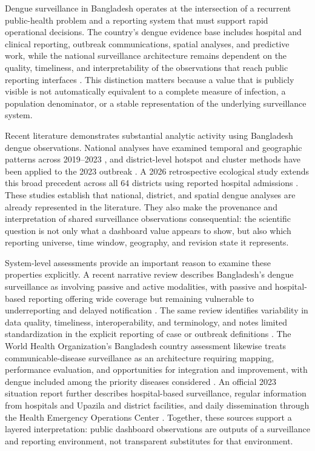 Dengue surveillance in Bangladesh operates at the intersection of a recurrent public-health problem and a reporting system that must support rapid operational decisions. The country's dengue evidence base includes hospital and clinical reporting, outbreak communications, spatial analyses, and predictive work, while the national surveillance architecture remains dependent on the quality, timeliness, and interpretability of the observations that reach public reporting interfaces \citep{ref1,ref6}. This distinction matters because a value that is publicly visible is not automatically equivalent to a complete measure of infection, a population denominator, or a stable representation of the underlying surveillance system.

Recent literature demonstrates substantial analytic activity using Bangladesh dengue observations. National analyses have examined temporal and geographic patterns across 2019--2023 \citep{ref2}, and district-level hotspot and cluster methods have been applied to the 2023 outbreak \citep{ref3}. A 2026 retrospective ecological study extends this broad precedent across all 64 districts using reported hospital admissions \citep{ref4}. These studies establish that national, district, and spatial dengue analyses are already represented in the literature. They also make the provenance and interpretation of shared surveillance observations consequential: the scientific question is not only what a dashboard value appears to show, but also which reporting universe, time window, geography, and revision state it represents.

System-level assessments provide an important reason to examine these properties explicitly. A recent narrative review describes Bangladesh's dengue surveillance as involving passive and active modalities, with passive and hospital-based reporting offering wide coverage but remaining vulnerable to underreporting and delayed notification \citep{ref1}. The same review identifies variability in data quality, timeliness, interoperability, and terminology, and notes limited standardization in the explicit reporting of case or outbreak definitions \citep{ref1}. The World Health Organization's Bangladesh country assessment likewise treats communicable-disease surveillance as an architecture requiring mapping, performance evaluation, and opportunities for integration and improvement, with dengue included among the priority diseases considered \citep{ref6}. An official 2023 situation report further describes hospital-based surveillance, regular information from hospitals and Upazila and district facilities, and daily dissemination through the Health Emergency Operations Center \citep{ref7}. Together, these sources support a layered interpretation: public dashboard observations are outputs of a surveillance and reporting environment, not transparent substitutes for that environment.

